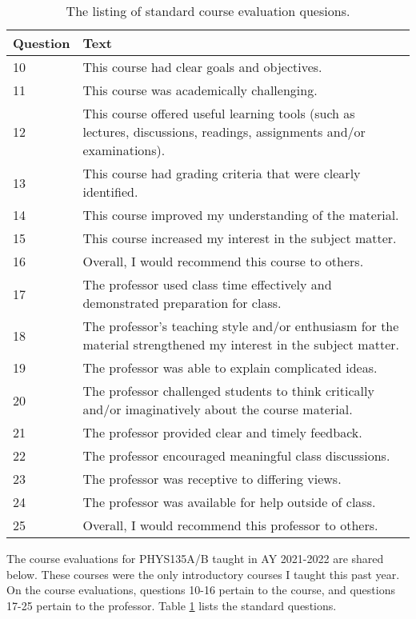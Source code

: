 \documentclass[../../main.tex]{subfiles}
\begin{document}
\begin{table}[ht]
\scriptsize
\centering
\begin{tabular}{| p{1.5cm} | p{15cm} |}
\hline
\hline
Question & Text \\ \hline
10 & This course had clear goals and objectives. \\ \hline
11 & This course was academically challenging. \\ \hline
12 & This course offered useful learning tools (such as lectures, discussions, readings, assignments and/or examinations). \\ \hline
13 & This course had grading criteria that were clearly identified. \\ \hline
14 & This course improved my understanding of the material. \\ \hline
15 & This course increased my interest in the subject matter. \\ \hline
16 & Overall, I would recommend this course to others. \\ \hline
17 & The professor used class time effectively and demonstrated preparation for class. \\ \hline
18 & The professor's teaching style and/or enthusiasm for the material strengthened my interest in the subject matter. \\ \hline
19 & The professor was able to explain complicated ideas. \\ \hline
20 & The professor challenged students to think critically and/or imaginatively about the course material. \\ \hline
21 & The professor provided clear and timely feedback. \\ \hline
22 & The professor encouraged meaningful class discussions. \\ \hline
23 & The professor was receptive to differing views. \\ \hline
24 & The professor was available for help outside of class. \\ \hline
25 & Overall, I would recommend this professor to others. \\ \hline
\hline
\end{tabular}
\caption{\label{tab:questions} The listing of standard course evaluation quesions.}
\end{table}

The course evaluations for PHYS135A/B taught in AY 2021-2022 are shared below.  These courses were the only introductory courses I taught this past year.  On the course evaluations, questions 10-16 pertain to the course, and questions 17-25 pertain to the professor.  Table \ref{tab:questions} lists the standard questions.
\\
\vspace{0.25cm}
\end{document}
